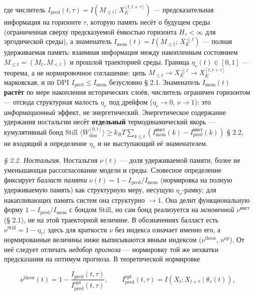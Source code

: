 \documentclass[12pt]{iopart}
\providecommand{\lt}{<}\providecommand{\gt}{>}
\begin{document}
где числитель \(I_{\text{pred}}(t,\tau) = I(M_{\le t};\, X_E^{[t,t+\tau]})\) --- предсказательная информация на горизонте \(\tau\), которую память несёт о будущем среды (ограниченная сверху предсказуемой ёмкостью горизонта \(H_\tau < \infty\) для эргодической среды), а знаменатель \(I_{\text{mem}}(t) = I(M_{\le t};\, X_E^{\le t})\) --- полная удерживаемая память: взаимная информация между накопленным состоянием \(M_{\le t} = (M_t, M_{\lt t})\) и прошлой траекторией среды. Граница \(\eta_v(t) \in [0,1]\) --- теорема, а не нормировочное соглашение: цепь \(M_{\le t} \to X_E^{\le t} \to X_E^{[t,t+\tau]}\) марковская, и по DPI \(I_{\text{pred}} \le I_{\text{mem}}\) безусловно \cite{Andriishin2026b} § 2.1. Знаменатель \(I_{\text{mem}}(t)\) \textbf{растёт} по мере накопления исторических слоёв, числитель ограничен горизонтом --- отсюда структурная малость \(\eta_v\) под дрейфом (\(\eta_v \to 0\), \(\nu \to 1\)); это \emph{информационный} эффект, не энергетический. Энергетическое содержание удержания ностальгии несёт \textbf{отдельный} термодинамический якорь --- кумулятивный бонд Still \(\langle W_{\text{diss}}^{[0,t]}\rangle \ge k_B T \sum_{k\le t}(I_{\text{mem}}^{\text{инст}}(k) - I_{\text{pred}}^{\text{инст}}(k))\) \cite{Still2012,Andriishin2026b} § 2.2, не входящий в определение \(\eta_v\) и не выступающий её знаменателем.



\emph{§ 2.2. Ностальгия.} Ностальгия \(\nu(t)\) --- доля удерживаемой памяти, более не уменьшающая рассогласование модели и среды. Словесное определение фиксирует \emph{балласт памяти} \(\nu(t) = 1 - I_{\text{pred}}/I_{\text{mem}}\) (нормировка на полную удерживаемую память) как структурную меру, несущую \(\eta_v\)-рамку; для накапливающих память систем она структурно \(\to 1\). Она делит функциональную форму \(1-I_{\text{pred}}/I_{\text{mem}}\) с бондом Still, но сам бонд реализуется на \emph{мгновенной} \(\nu^{\text{инст}}\) (§ 2.1), не на этой траекторной величине. В обозначениях \cite{Andriishin2026b} балласт есть \(\nu^{\text{Still}} = 1 - \eta_v\); здесь для краткости \(\nu\) без индекса означает именно его, а нормированные величины ниже выписываются явным индексом (\(\nu^{\text{theor}}\), \(\nu^{\text{op}}\)). От неё следует отличать \emph{недобор прогноза} --- нормировку той же нехватки предсказания на оптимум прогноза. В теоретической нормировке \cite{Andriishin2026b}



\[\nu^{\text{theor}}(t) = 1 - \frac{I_{\text{pred}}(t,\tau)}{I_{\text{pred}}^{\text{opt}}(t,\tau)}, \qquad I_{\text{pred}}^{\text{opt}}(t,\tau) = I(X_t; X_{t+\tau} \mid \theta_v(t)),\]
\end{document}
